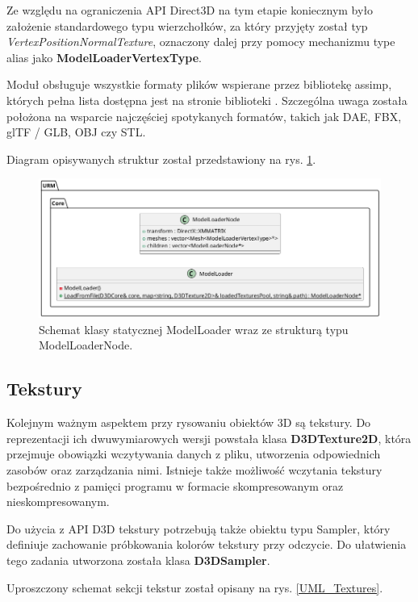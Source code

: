 	Ze względu na ograniczenia API Direct3D na tym etapie koniecznym było założenie standardowego typu wierzchołków, za który przyjęty został typ \textit{VertexPositionNormalTexture}, oznaczony dalej przy pomocy mechanizmu type alias jako \textbf{ModelLoaderVertexType}.
	
	Moduł obsługuje wszystkie formaty plików wspierane przez bibliotekę assimp, których pełna lista dostępna jest na stronie biblioteki \cite{github:assimp:FileFormats}. Szczególna uwaga została położona na wsparcie najczęściej spotykanych formatów, takich jak DAE, FBX, glTF / GLB, OBJ czy STL.
	
	Diagram opisywanych struktur został przedstawiony na rys. \ref{UML_ModelLoader}.
		
	\begin{figure}[h!]
		\centering
		\includegraphics[width=\textwidth]{images/UML/modelloader.png}
		\caption{Schemat klasy statycznej ModelLoader wraz ze strukturą typu ModelLoaderNode.}
		\label{UML_ModelLoader}
	\end{figure}

\subsection{Tekstury}
	Kolejnym ważnym aspektem przy rysowaniu obiektów 3D są tekstury. Do reprezentacji ich dwuwymiarowych wersji powstała klasa \textbf{D3DTexture2D}, która przejmuje obowiązki wczytywania danych z pliku, utworzenia odpowiednich zasobów oraz zarządzania nimi. Istnieje także możliwość wczytania tekstury bezpośrednio z pamięci programu w formacie skompresowanym oraz nieskompresowanym.
	
	Do użycia z API D3D tekstury potrzebują także obiektu typu Sampler, który definiuje zachowanie próbkowania kolorów tekstury przy odczycie. Do ułatwienia tego zadania utworzona została klasa \textbf{D3DSampler}.
	
	Uproszczony schemat sekcji tekstur został opisany na rys. \ref{UML_Textures}.
	
